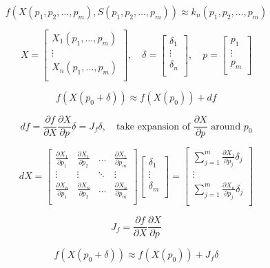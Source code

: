 \documentclass{article}
\begin{document}
\begin{multicols}{2}
	\[
		f(X(p_1, p_2, \ldots, p_m), S(p_1, p_2, \ldots, p_m)) \approx k_n (p_1, p_2, \ldots, p_m)
	\]

	\[
		X = \begin{bmatrix}
			X_1(p_1, \ldots, p_m) \\
			\vdots                \\
			X_n(p_1, \ldots, p_m) \\
		\end{bmatrix},
		\quad
		\delta = \begin{bmatrix}
			\delta_1 \\
			\vdots   \\
			\delta_n \\
		\end{bmatrix},
		\quad
		p = \begin{bmatrix}
			p_1    \\
			\vdots \\
			p_m    \\
		\end{bmatrix}
	\]

	\[
		f(X(p_0 + \delta)) \approx f(X(p_0)) + df
	\]

	\[
		df = \frac{\partial f}{\partial X} \frac{\partial X}{\partial p} \delta = J_f \delta,
		\quad
		\text{take expansion of } \frac{\partial X}{\partial p} \text{ around } p_0
	\]

	\[
		dX = \begin{bmatrix}
			\frac{\partial X_1}{\partial p_1} & \frac{\partial X_1}{\partial p_2} & \ldots & \frac{\partial X_1}{\partial p_m} \\
			\vdots                            & \vdots                            & \ddots & \vdots                            \\
			\frac{\partial X_n}{\partial p_1} & \frac{\partial X_n}{\partial p_2} & \ldots & \frac{\partial X_n}{\partial p_m} \\
		\end{bmatrix}
		\begin{bmatrix}
			\delta_1 \\
			\vdots   \\
			\delta_m \\
		\end{bmatrix}
		= \begin{bmatrix}
			\sum \limits_{j=1}^{m} \frac{\partial X_1}{\partial p_j} \delta_j \\
			\vdots                                                            \\
			\sum \limits_{j=1}^{m} \frac{\partial X_n}{\partial p_j} \delta_j \\
		\end{bmatrix}
	\]


	\[
		J_f = \frac{\partial f}{\partial X} \frac{\partial X}{\partial p}
	\]

	\[
		f(X(p_0 + \delta)) \approx f(X(p_0)) + J_f \delta
	\]



\end{multicols}
\end{document}
